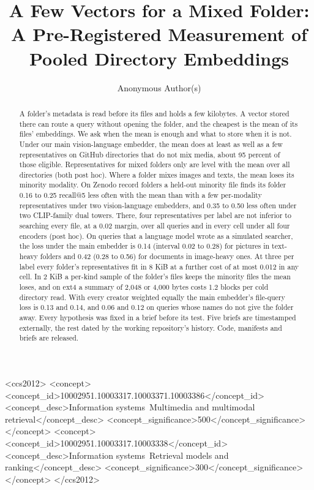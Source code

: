 \documentclass[sigconf,natbib=true,anonymous=true]{acmart}
\begin{document}
\title{A Few Vectors for a Mixed Folder: A Pre-Registered Measurement of Pooled Directory Embeddings}

\author{Anonymous Author(s)}

\begin{abstract}
A folder's metadata is read before its files and holds a few kilobytes. A vector stored there can route a query without opening the folder, and the cheapest is the mean of its files' embeddings. We ask when the mean is enough and what to store when it is not. Under our main vision-language embedder, the mean does at least as well as a few representatives on GitHub directories that do not mix media, about 95 percent of those eligible. Representatives for mixed folders only are level with the mean over all directories (both post hoc). Where a folder mixes images and texts, the mean loses its minority modality. On Zenodo record folders a held-out minority file finds its folder 0.16 to 0.25 recall@5 less often with the mean than with a few per-modality representatives under two vision-language embedders, and 0.35 to 0.50 less often under two CLIP-family dual towers. There, four representatives per label are not inferior to searching every file, at a 0.02 margin, over all queries and in every cell under all four encoders (post hoc). On queries that a language model wrote as a simulated searcher, the loss under the main embedder is 0.14 (interval 0.02 to 0.28) for pictures in text-heavy folders and 0.42 (0.28 to 0.56) for documents in image-heavy ones. At three per label every folder's representatives fit in 8 KiB at a further cost of at most 0.012 in any cell. In 2 KiB a per-kind sample of the folder's files keeps the minority files the mean loses, and on ext4 a summary of 2,048 or 4,000 bytes costs 1.2 blocks per cold directory read. With every creator weighted equally the main embedder's file-query loss is 0.13 and 0.14, and 0.06 and 0.12 on queries whose names do not give the folder away. Every hypothesis was fixed in a brief before its test. Five briefs are timestamped externally, the rest dated by the working repository's history. Code, manifests and briefs are released.
\end{abstract}

\begin{CCSXML}
<ccs2012>
<concept><concept_id>10002951.10003317.10003371.10003386</concept_id>
<concept_desc>Information systems~Multimedia and multimodal retrieval</concept_desc>
<concept_significance>500</concept_significance></concept>
<concept><concept_id>10002951.10003317.10003338</concept_id>
<concept_desc>Information systems~Retrieval models and ranking</concept_desc>
<concept_significance>300</concept_significance></concept>
</ccs2012>
\end{CCSXML}
\end{document}
